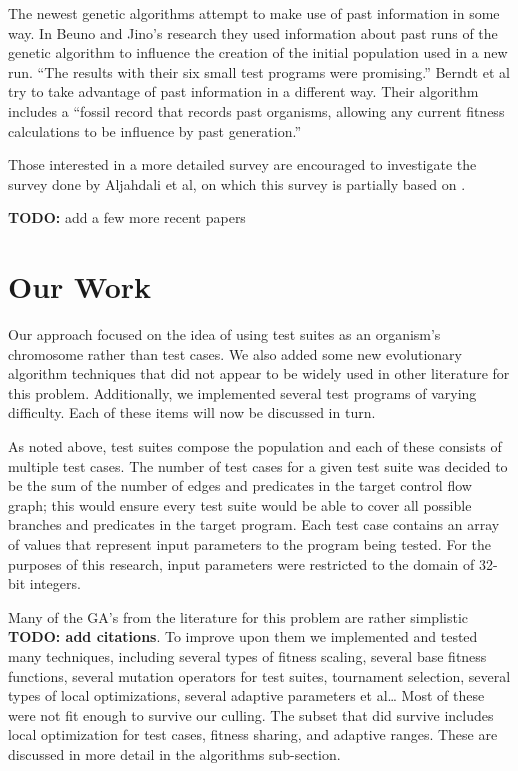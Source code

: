 \documentclass[runningheads]{llncs}
\begin{document}
The newest genetic algorithms attempt to make use of past information in some way. In Beuno and Jino's research they used information about past runs of the genetic algorithm to influence the creation of the initial population used in a new run\cite{limits6}. ``The results with their six small test programs were promising.''\cite{limits6} Berndt et al try to take advantage of past information in a different way. Their algorithm includes a ``fossil record that records past organisms, allowing any current fitness calculations to be influence by past generation.''\cite{limits6}

Those interested in a more detailed survey are encouraged to investigate the survey done by Aljahdali et al, on which this survey is partially based on \cite{limits6}.

\textbf{TODO:} add a few more recent papers




\newpage
\section{Our Work}
Our approach focused on the idea of using test suites as an organism's chromosome rather than test cases. We also added some new evolutionary algorithm techniques that did not appear to be widely used in other literature for this problem. Additionally, we implemented several test programs of varying difficulty. Each of these items will now be discussed in turn.

As noted above, test suites compose the population and each of these consists of multiple test cases. The number of test cases for a given test suite was decided to be the sum of the number of edges and predicates in the target control flow graph; this would ensure every test suite would be able to cover all possible branches and predicates in the target program. Each test case contains an array of values that represent input parameters to the program being tested. For the purposes of this research, input parameters were restricted to the domain of 32-bit integers.

Many of the GA’s from the literature for this problem are rather simplistic \textbf{TODO: add citations}. To improve upon them we implemented and tested many techniques, including several types of fitness scaling, several base fitness functions, several mutation operators for test suites, tournament selection, several types of local optimizations, several adaptive parameters et al… Most of these were not fit enough to survive our culling. The subset that did survive includes local optimization for test cases, fitness sharing, and adaptive ranges. These are discussed in more detail in the algorithms sub-section.
\end{document}
